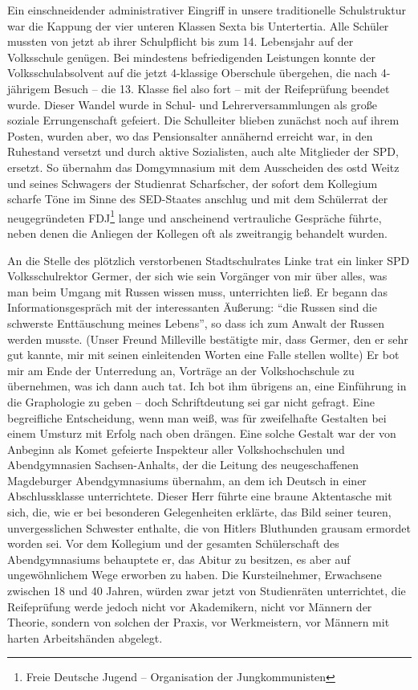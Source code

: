 \documentclass[a5paper,pagesize,10pt,twoside=true]{scrbook}
\renewcommand{\marginpar}[2][]{}
\begin{document}
Ein einschneidender administrativer Eingriff in unsere traditionelle Schulstruktur war die Kappung der vier unteren Klassen Sexta bis Untertertia. Alle Schüler mussten von jetzt ab ihrer Schulpflicht bis zum 14. Lebensjahr auf der Volksschule genügen. Bei mindestens befriedigenden Leistungen konnte der Volksschulabsolvent auf die jetzt 4-klassige Oberschule übergehen, die nach 4-jährigem Besuch -- die 13. Klasse fiel also fort -- mit der Reifeprüfung beendet wurde. Dieser Wandel wurde in Schul- und Lehrerversammlungen als große soziale Errungenschaft gefeiert. Die Schulleiter blieben zunächst noch auf ihrem Posten, wurden aber, wo das Pensionsalter annähernd erreicht war, in den Ruhestand versetzt und durch aktive Sozialisten, auch alte Mitglieder der SPD, ersetzt. So übernahm das Domgymnasium mit dem Ausscheiden des \ac{ostd} Weitz und seines Schwagers der Studienrat Scharfscher, der sofort dem Kollegium \marginpar{146} scharfe Töne im Sinne des SED-Staates anschlug und mit dem Schülerrat der neugegründeten FDJ\footnote{Freie Deutsche Jugend -- Organisation der Jungkommunisten} lange und anscheinend vertrauliche Gespräche führte, neben denen die Anliegen der Kollegen oft als zweitrangig behandelt wurden.

An die Stelle des plötzlich verstorbenen Stadtschulrates Linke trat ein linker SPD Volksschulrektor Germer, der sich wie sein Vorgänger von mir über alles, was man beim Umgang mit Russen wissen muss, unterrichten ließ. Er begann das Informationsgespräch mit der interessanten Äußerung: \enquote{die Russen sind die schwerste Enttäuschung meines Lebens}, so dass ich zum Anwalt der Russen werden musste. (Unser Freund Milleville bestätigte mir, dass Germer, den er sehr gut kannte, mir mit seinen einleitenden Worten eine Falle stellen wollte) Er bot mir am Ende der Unterredung an, Vorträge an der Volkshochschule zu übernehmen, was ich dann auch tat. Ich bot ihm übrigens an, eine Einführung in die Graphologie zu geben -- doch Schriftdeutung sei gar nicht gefragt. Eine begreifliche Entscheidung, wenn man weiß, was für zweifelhafte Gestalten bei einem Umsturz mit Erfolg nach oben drängen. Eine solche Gestalt war der von Anbeginn als Komet gefeierte Inspekteur aller Volkshochschulen und Abendgymnasien Sachsen-Anhalts, der \marginpar{147} die Leitung des neugeschaffenen Magdeburger Abendgymnasiums übernahm, an dem ich Deutsch in einer Abschlussklasse unterrichtete. Dieser Herr führte eine braune Aktentasche mit sich, die, wie er bei besonderen Gelegenheiten erklärte, das Bild seiner teuren, unvergesslichen Schwester enthalte, die von Hitlers Bluthunden grausam ermordet worden sei. Vor dem Kollegium und der gesamten Schülerschaft des Abendgymnasiums behauptete er, das Abitur zu besitzen, es aber auf ungewöhnlichem Wege erworben zu haben. Die Kursteilnehmer, Erwachsene zwischen 18 und 40 Jahren, würden zwar jetzt von Studienräten unterrichtet, die Reifeprüfung werde jedoch nicht vor Akademikern, nicht vor Männern der Theorie, sondern von solchen der Praxis, vor Werkmeistern, vor Männern mit harten Arbeitshänden abgelegt.
\end{document}
